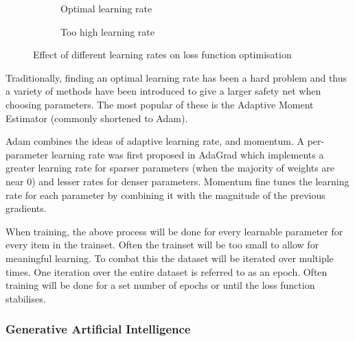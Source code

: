 \begin{figure}[H]
\begin{subfigure}{0.3\textwidth}
\begin{tikzpicture}
        \end{tikzpicture}
        \caption{Optimal learning rate}
    \end{subfigure}
    \hfill
    \begin{subfigure}{0.3\textwidth}
        \centering
        \caption{Too high learning rate}
    \end{subfigure}
    \caption{Effect of different learning rates on loss function optimisation}
    \label{fig:learning-rates}
\end{figure}

Traditionally, finding an optimal learning rate has been a hard problem and thus a variety of methods have been introduced to give a larger safety net when choosing parameters. The most popular of these is the Adaptive Moment Estimator (commonly shortened to Adam)\cite{kingma2014adam}.

Adam combines the ideas of adaptive learning rate, and momentum. A per-parameter learning rate was first proposed in AdaGrad\cite{duchi2011adaptive} which implements a greater learning rate for sparser parameters (when the majority of weights are near 0) and lesser rates for denser parameters. Momentum fine tunes the learning rate for each parameter by combining it with the magnitude of the previous gradients.

When training, the above process will be done for every learnable parameter for every item in the trainset. Often the trainset will be too small to allow for meaningful learning. To combat this the dataset will be iterated over multiple times. One iteration over the entire dataset is referred to as an epoch\cite{begmann-backpropagation}. Often training will be done for a set number of epochs or until the loss function stabilises. 

\subsubsection{Generative Artificial Intelligence}

